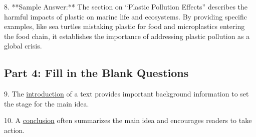 \documentclass[12pt]{article}
\begin{document}
8. **Sample Answer:** The section on “Plastic Pollution Effects” describes the harmful impacts of plastic on marine life and ecosystems. By providing specific examples, like sea turtles mistaking plastic for food and microplastics entering the food chain, it establishes the importance of addressing plastic pollution as a global crisis.

\subsection*{Part 4: Fill in the Blank Questions}

9. The \underline{introduction} of a text provides important background information to set the stage for the main idea.

10. A \underline{conclusion} often summarizes the main idea and encourages readers to take action.
\end{document}
